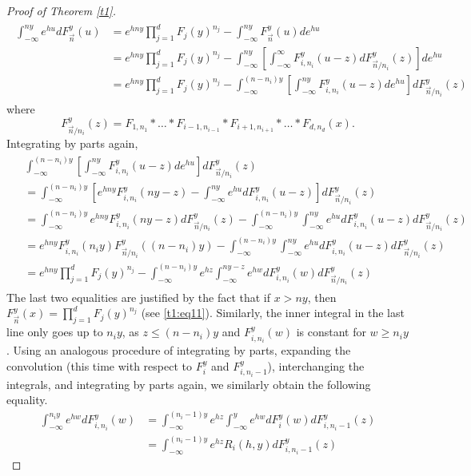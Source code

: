 \documentclass[12pt]{article}
\numberwithin{equation}{section}
\begin{document}
\begin{proof}[Proof of Theorem \ref{t1}]
\begin{align}\label{t1:eq5}
\begin{aligned}
   \int_{-\infty}^{ny} e^{hu} d F^y_{\vec{n}}(u) &= e^{hny} \prod_{j=1}^d F_j(y)^{n_j} - \int_{-\infty}^{ny} F^y_{\vec{n}}(u) d e^{hu} \\&= e^{hny} \prod_{j=1}^d F_j(y)^{n_j} - \int_{-\infty}^{ny} \left[\int_{-\infty}^\infty F^y_{i,n_i}(u-z)  dF^y_{\vec{n}/n_i}(z)\right]d e^{hu} \\&=
    e^{hny} \prod_{j=1}^d F_j(y)^{n_j} - \int_{-\infty}^{(n-n_i)y} \left[\int_{-\infty}^{ny} F^y_{i,n_i}(u-z)  d e^{hu}\right]dF^y_{\vec{n}/n_i}(z)
    \end{aligned}
\end{align}
where 
\[
F^y_{\vec{n}/n_i}(z) =  F_{1,n_1}  \ast \dots \ast F_{i-1,n_{i-1}}\ast F_{i+1,n_{i+1}}\ast \dots \ast F_{d,n_d}(x).
\]
Integrating by parts again,
\begin{align}
\begin{aligned}\label{t1:eq6}
&\int_{-\infty}^{(n-n_i)y} \left[\int_{-\infty}^{ny} F^y_{i,n_i}(u-z)  d e^{hu}\right]dF^y_{\vec{n}/n_i}(z) \\&=  \int_{-\infty}^{(n-n_i)y} \left[e^{hny}F^y_{i,n_i}(ny-z)-\int_{-\infty}^{ny}   e^{hu}dF^y_{i,n_i}(u-z)\right]dF^y_{\vec{n}/n_i}(z) \\&=
\int_{-\infty}^{(n-n_i)y} e^{hny}F^y_{i,n_i}(ny-z)dF^y_{\vec{n}/n_i}(z)-\int_{-\infty}^{(n-n_i)y}\int_{-\infty}^{ny}   e^{hu}dF^y_{i,n_i}(u-z)dF^y_{\vec{n}/n_i}(z) \\&= e^{hny}F^y_{i,n_i}(n_iy)F^y_{\vec{n}/n_i}((n-n_i)y)-\int_{-\infty}^{(n-n_i)y}\int_{-\infty}^{ny}   e^{hu}dF^y_{i,n_i}(u-z)dF^y_{\vec{n}/n_i}(z) \\&=
e^{hny} \prod_{j=1}^d F_j(y)^{n_j} - \int_{-\infty}^{(n-n_i)y}e^{hz}\int_{-\infty}^{ny -z}   e^{hw}dF^y_{i,n_i}(w)dF^y_{\vec{n}/n_i}(z) 
\end{aligned}
\end{align}
The last two equalities are justified by the fact that if $x>ny$, then $F^y_{\vec{n}}(x) = \prod_{j=1}^d F_j(y)^{n_j} $ (see \eqref{t1:eq11}). Similarly, the inner integral in the last line only goes up to $n_iy$, as $z\leq (n-n_i)y$ and $F^y_{i,n_i}(w)$ is constant for $w\geq n_iy$. Using an analogous procedure of integrating by parts, expanding the convolution (this time with respect to $F_i^y$ and $F_{i,n_i-1}^y$), interchanging the integrals, and integrating by parts again, we similarly obtain the following equality.
\begin{align*}
    \int_{-\infty}^{n_i y}   e^{hw}dF^y_{i,n_i}(w) &=  \int_{-\infty}^{(n_i-1)y}e^{hz} \int_{-\infty}^y e^{hw} dF_{i}^y(w)dF_{i,n_i-1}^y(z) \\&= \int_{-\infty}^{(n_i-1)y}e^{hz} R_i(h,y)dF_{i,n_i-1}^y(z)

\end{align*}
\end{proof}
\end{document}
